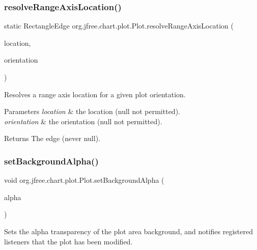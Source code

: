 \subsubsection{\texorpdfstring{resolve\+Range\+Axis\+Location()}{resolveRangeAxisLocation()}}
{\footnotesize\ttfamily static Rectangle\+Edge org.\+jfree.\+chart.\+plot.\+Plot.\+resolve\+Range\+Axis\+Location (\begin{DoxyParamCaption}\item[{\mbox{\hyperlink{classorg_1_1jfree_1_1chart_1_1axis_1_1_axis_location}{Axis\+Location}}}]{location,  }\item[{\mbox{\hyperlink{classorg_1_1jfree_1_1chart_1_1plot_1_1_plot_orientation}{Plot\+Orientation}}}]{orientation }\end{DoxyParamCaption})\hspace{0.3cm}{\ttfamily [static]}}

Resolves a range axis location for a given plot orientation.


\begin{DoxyParams}{Parameters}
{\em location} & the location ({\ttfamily null} not permitted). \\
\hline
{\em orientation} & the orientation ({\ttfamily null} not permitted).\\
\hline
\end{DoxyParams}
\begin{DoxyReturn}{Returns}
The edge (never {\ttfamily null}). 
\end{DoxyReturn}
\mbox{\label{classorg_1_1jfree_1_1chart_1_1plot_1_1_plot_a3af5eaa2997e7c1f88c87178e5cb41e4}} 
\subsubsection{\texorpdfstring{set\+Background\+Alpha()}{setBackgroundAlpha()}}
{\footnotesize\ttfamily void org.\+jfree.\+chart.\+plot.\+Plot.\+set\+Background\+Alpha (\begin{DoxyParamCaption}\item[{float}]{alpha }\end{DoxyParamCaption})}

Sets the alpha transparency of the plot area background, and notifies registered listeners that the plot has been modified.


